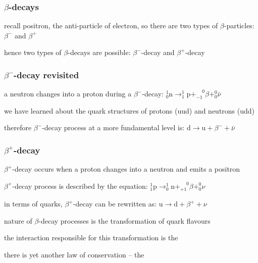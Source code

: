 \subsubsection{\texorpdfstring{$\beta$}{\textbeta}-decays}

recall positron, the anti-particle of electron, so there are two types of $\beta$-particles: $\beta^-$ and $\beta^+$

hence two types of $\beta$-decays are possible: $\beta^-$-decay and $\beta^+$-decay



\subsubsection*{\texorpdfstring{$\beta^-$}{\textbeta\textsubscript{-}}-decay revisited}

a neutron changes into a proton during a $\beta^-$-decay: $\boxed{_0^1 \text{n} \longrightarrow _1^1 \text{p} + _{-1}^{\phantom{+}0}\beta + _0^0 \bar{\nu}} $

we have learned about the quark structures of protons (uud) and neutrons (udd)

therefore $\beta^-$-decay process at a more fundamental level is: $ \boxed{\text{d} \longrightarrow \text{u} + \beta^- + \bar{\nu}} $


\subsubsection*{\texorpdfstring{$\beta^+$}{\textbeta\textsubscript{+}}-decay}


$\beta^+$-decay occurs when a proton changes into a neutron and emits a positron

$\beta^+$-decay process is described by the equation: $ \boxed{_1^1 \text{p} \longrightarrow _0^1 \text{n} + _{+1}^{\phantom{+}0}\beta + _0^0 \nu} $

in terms of quarks, $\beta^+$-decay can be rewritten as: $ \boxed{\text{u} \longrightarrow \text{d} + \beta^+ + \nu} $

\vspace*{\baselineskip}

\cmt nature of $\beta$-decay processes is the transformation of quark flavours

the interaction responsible for this transformation is the 

\cmt there is yet another law of conservation -- the 

